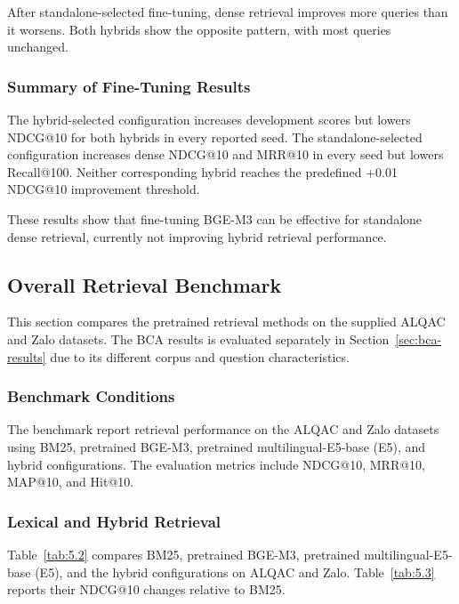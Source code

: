 After standalone-selected fine-tuning, dense retrieval improves more queries than it worsens. Both hybrids show the opposite pattern, with most queries unchanged.

\subsubsection{Summary of Fine-Tuning Results}

The hybrid-selected configuration increases development scores but lowers NDCG@10 for both hybrids in every reported seed. The standalone-selected configuration increases dense NDCG@10 and MRR@10 in every seed but lowers Recall@100. Neither corresponding hybrid reaches the predefined +0.01 NDCG@10 improvement threshold.

These results show that fine-tuning BGE-M3 can be effective for standalone dense retrieval, currently not improving hybrid retrieval performance.

\subsection{Overall Retrieval Benchmark}
\label{sec:overall-benchmark}

This section compares the pretrained retrieval methods on the supplied ALQAC and Zalo datasets. The BCA results is evaluated separately in Section~\ref{sec:bca-results} due to its different corpus and question characteristics. 

\subsubsection{Benchmark Conditions}

The benchmark report retrieval performance on the ALQAC and Zalo datasets using BM25, pretrained BGE-M3, pretrained multilingual-E5-base (E5), and hybrid configurations. The evaluation metrics include NDCG@10, MRR@10, MAP@10, and Hit@10.
\subsubsection{Lexical and Hybrid Retrieval}

Table~\ref{tab:5.2} compares BM25, pretrained BGE-M3, pretrained multilingual-E5-base (E5), and the hybrid configurations on ALQAC and Zalo. Table~\ref{tab:5.3} reports their NDCG@10 changes relative to BM25.

